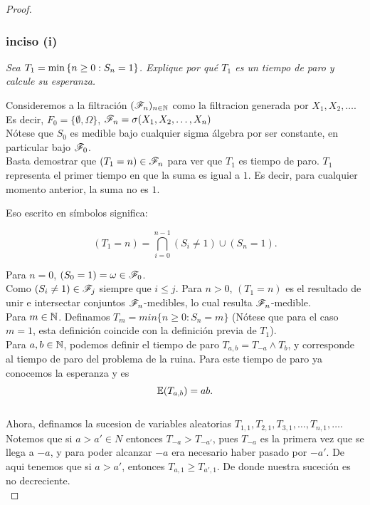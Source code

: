 \begin{proof}
	\subsubsection{inciso (i)}
	\emph
	{
		Sea $T_1=\min\left\{ n\geq 0:S_n=1\right\} $. Explique por qu\'e $T_1$ es un 
		tiempo de paro y calcule su esperanza.\\
	}
	
		Consideremos a la filtración $(\mathscr{F}_n)_{n\in\mathbb{N}}$ como la filtracion 
		generada por $X_1, X_2, \dots$.\\

		Es decir, $F_0 = \{\emptyset, \Omega\}$, $\mathscr{F}_n = \sigma(X_1, X_2, \dots, X_n)$\\
	
		Nótese que $S_0$ es medible bajo cualquier sigma álgebra por ser constante, en particular bajo
		$\mathscr{F}_0$.\\
	
		Basta demostrar que $(T_1 = n) \in \mathscr{F}_n$ para ver que $T_1$ es tiempo de paro. $T_1$ 
		representa el primer tiempo en que la suma es igual a $1$. Es decir, para cualquier 
		momento anterior, la suma no es $1$.
	
		Eso escrito en símbolos significa:
	
		$$(T_1 = n) = \bigcap_{i=0}^{n-1}(S_i \not= 1) \cup (S_n = 1).$$ 
	
		Para $n=0$, $(S_0 = 1) = \omega \in \mathscr{F}_0$. \\
	
		Como $(S_i \not= 1) \in \mathscr{F}_j$ siempre que $i \leq j$. Para $n>0$, $(T_1 = n)$ es el resultado de 
		unir e intersectar conjuntos $\mathscr{F}_n$-medibles, lo cual resulta $\mathscr{F}_n$-medible.\\
	
		Para $m \in \mathbb{N}$. Definamos $T_m = min\{n \geq 0 : S_n = m\}$ 
		(Nótese que para el caso $m=1$, esta definición	coincide con la definición previa de $T_1$).\\
		
		Para $a,b \in \mathbb{N}$, podemos definir el tiempo de paro $T_{a,b} = T_{-a} \wedge T_b$, y 
		corresponde al 	tiempo de paro del problema de la ruina. Para este tiempo de paro ya conocemos 
		la esperanza y es
		$$\mathbb{E}(T_{a,b}) = ab.$$\\
		
		Ahora, definamos la sucesion de variables aleatorias $T_{1,1}, T_{2,1}, T_{3,1}, \dots, T_{n,1}, 
		\dots$. Notemos que si $a>a' \in N$ entonces $T_{-a} > T_{-a'}$, pues $T_{-a}$ es la primera vez
		que se llega a $-a$, y para poder alcanzar $-a$ era necesario haber pasado por $-a'$.
		De aqui tenemos que si $a>a'$, entonces $T_{a,1} \geq T_{a',1}$. De donde nuestra suceción es 
		no decreciente.\\
		

\end{proof}
